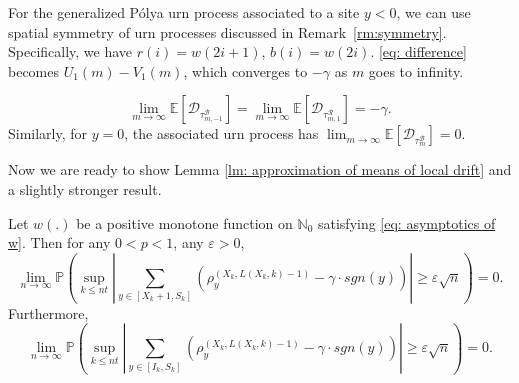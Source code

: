 \documentclass[EJP]{ejpecp} %
\newcommand{\abs}[1]{\left\vert #1 \right\vert}
\begin{document}
For the generalized P\'{o}lya urn process associated to a site $y<0$, we can use spatial symmetry of urn processes discussed in Remark~\ref{rm:symmetry}. Specifically, we have $r(i) = w(2i+1)$, $b(i) =w(2i)$. \eqref{eq: difference} becomes $U_1(m)-V_1(m)$, which converges to $-\gamma$ as $m$ goes to infinity.

\begin{equation}\label{eq: general expected drift}
	\lim_{m\to\infty}\mathbb{E}\left[ \mathscr{D}_{\tau^{\mathscr{B}}_{m,-1}} \right] = \lim_{m\to\infty}\mathbb{E}\left[ \mathscr{D}_{\tau^{\mathscr{R}}_{m,1}} \right] = -\gamma.
\end{equation}
Similarly, for $y=0$, the associated urn process has 
$\lim_{m\to\infty}\mathbb{E}\left[ \mathscr{D}_{\tau^{\mathscr{B}}_m} \right] = 0.$

%		
Now we are ready to show Lemma \ref{lm: approximation of means of local drift}
and a slightly stronger result.
\begin{lemma}
	Let $w(.)$ be a positive monotone function on $\mathbb{N}_0$ satisfying \eqref{eq: asymptotics of w}. Then for any $0<p<1$, any $\varepsilon>0$,
	\[
	\lim_{n\to\infty} \mathbb{P}\left( \sup_{k\leq n t}  \abs{  	\sum_{y\in \left[X_{k}+1 ,S_{k}\right]} \left( \rho^{(X_k,L(X_k,k)-1)}_y -  \gamma \cdot sgn(y) \right) } \geq  \varepsilon \sqrt{n}     \right) =0.
	\]
	Furthermore,
	\[
	\lim_{n\to\infty} \mathbb{P}\left( \sup_{k\leq n t}  \abs{  	\sum_{y\in \left[I_k ,S_{k}\right]} \left( \rho^{(X_k,L(X_k,k)-1)}_y -  \gamma \cdot sgn(y) \right) } \geq  \varepsilon \sqrt{n}     \right) =0.
	\]
\end{lemma}
\end{document}
